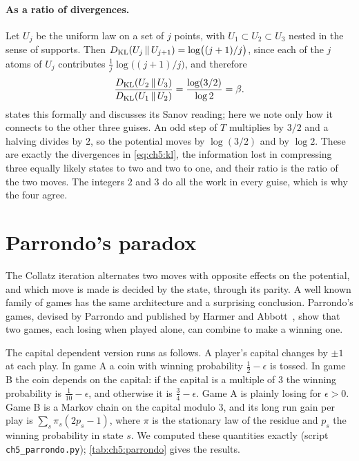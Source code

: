 \paragraph{As a ratio of divergences.}  Let $U_j$ be the uniform law on a set
of $j$ points, with $U_1\subset U_2\subset U_3$ nested in the sense of
supports.  Then $D_{\mathrm{KL}}(U_j\,\|\,U_{j+1})=\log\bigl((j+1)/j\bigr)$, since each of
the $j$ atoms of $U_j$ contributes $\tfrac1j\log\bigl((j+1)/j\bigr)$, and
therefore
\begin{equation}\label{eq:ch5:kl}
  \frac{D_{\mathrm{KL}}(U_2\,\|\,U_3)}{D_{\mathrm{KL}}(U_1\,\|\,U_2)}=\frac{\log(3/2)}{\log 2}=\beta .
\end{equation}
 states this formally and discusses its Sanov reading; here
we note only how it connects to the other three guises.
An odd step of $T$ multiplies by $3/2$ and a halving divides by $2$, so the potential moves by $\log(3/2)$ and by $\log2$.
These are exactly the divergences in \eqref{eq:ch5:kl}, the information lost in compressing three equally likely states to two and two to one, and their ratio is the ratio of the two moves.
The integers $2$ and $3$ do all the work in
every guise, which is why the four agree.

\section{Parrondo's paradox}\label{sec:ch5:parrondo}

The Collatz iteration alternates two moves with opposite effects on the
potential, and which move is made is decided by the state, through its
parity.  A well known family of games has the same architecture and a
surprising conclusion.
Parrondo's games, devised by Parrondo and published by Harmer and Abbott~\cite{harmer1999statsci,harmer1999}, show that two games, each losing when
played alone, can combine to make a winning one.

The capital dependent version runs as follows.  A player's capital changes by
$\pm1$ at each play.  In game A a coin with winning probability $\tfrac12-\epsilon$
is tossed.  In game B the coin depends on the capital: if the capital is a
multiple of $3$ the winning probability is $\tfrac1{10}-\epsilon$, and otherwise it
is $\tfrac34-\epsilon$.  Game A is plainly losing for $\epsilon>0$.  Game B is a
Markov chain on the capital modulo $3$, and its long run gain per play is
$\sum_s\pi_s(2p_s-1)$, where $\pi$ is the stationary law of the residue and
$p_s$ the winning probability in state $s$.  We computed these quantities
exactly (script \texttt{ch5\_parrondo.py}); \cref{tab:ch5:parrondo} gives
the results.


